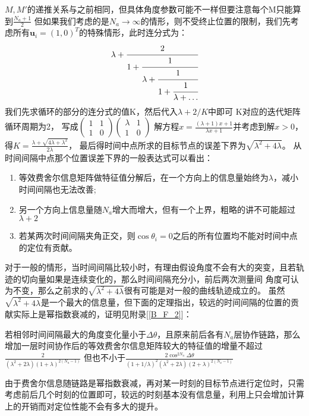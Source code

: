 $M,M'$的递推关系与之前相同，但具体角度参数可能不一样但要注意每个M只能算到$\frac{N_a+1}{2}$
但如果我们考虑的是$N_a\to \infty$的情形，则不受终止位置的限制，我们先考虑所有$\bm{u}_i=(1,0)^T$的特殊情形，此时连分式为：
\begin{equation}\label{eq:gcf_1}
\lambda+\cfrac{2}{1+\cfrac{1}{\lambda+\cfrac{1}{1+\cfrac{1}{\lambda+\dots}}}}
\end{equation}
我们先求循环的部分的连分式的值K，然后代入$\lambda+2/K$中即可
K对应的迭代矩阵循环周期为2，
写成$\begin{pmatrix}1 & 1 \\1 & 0\end{pmatrix}\begin{pmatrix}\lambda & 1 \\1 & 0\end{pmatrix}$
解方程$x=\frac{(\lambda+1)x+1}{\lambda x+1}$并考虑到解$x>0$，得$K=\frac{\lambda+\sqrt{4\lambda+\lambda^2}}{2\lambda}$，
最后得时间中点所求的目标节点的误差下界为$\sqrt{\lambda^2+4\lambda}$。
从时间间隔中点那个位置误差下界的一般表达式可以看出：
\begin{enumerate}
  \item 等效费舍尔信息矩阵做特征值分解后，在一个方向上的信息量始终为$\lambda$，减小时间间隔也无法改善;
  \item 另一个方向上信息量随$N_a$增大而增大，但有一个上界，粗略的讲不可能超过$\lambda+2$
  \item 若某两次时间间隔夹角正交，则$\cos\theta_i=0$之后的所有位置均不能对时间中点的定位有贡献。
\end{enumerate}
对于一般的情形，当时间间隔比较小时，有理由假设角度不会有大的突变，且若轨迹的切向量如果是连续变化的，那么时间间隔充分小，前后两次测量间
角度可认为不变，那么之前求的$\sqrt{\lambda^2+4\lambda}$很有可能是对一般的曲线轨迹成立的。
虽然$\sqrt{\lambda^2+4\lambda}$是一个最大的信息量，但下面的定理指出，较远的时间间隔的位置的贡献实际上是幂指数衰减的，证明见附录[\ref{B_F_2}]：
\begin{theorem}
若相邻时间间隔最大的角度变化量小于$\Delta \theta$，且原来前后各有$N_a$层协作链路，那么增加一层时间协作后的等效费舍尔信息矩阵较大的特征值的增量不超过
$\frac{2}{(\lambda^2+2\lambda)(1+\lambda)^{2(N_a-1)}}$
但也不小于$\frac{2\cos^{2N_a}\Delta\theta}{(1+1/\lambda)^2(\lambda^2+2\lambda)(2+\lambda)^{2(N_a-1)}}$
\end{theorem}
\begin{remark}
由于费舍尔信息随链路是幂指数衰减，再对某一时刻的目标节点进行定位时，只需考虑前后几个时刻的位置即可，较远的时刻基本没有信息量，利用上只会增加计算上的开销而对定位性能不会有多大的提升。
\end{remark}
